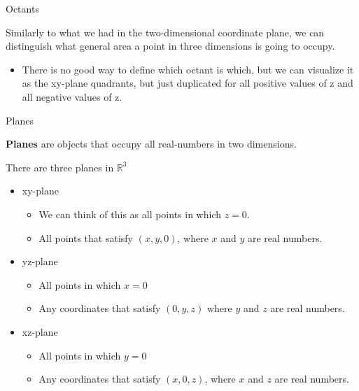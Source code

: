 \documentclass{report}
\newcommand{\R}{\mathbb{R}}
\begin{document}
\begin{sloppypar}
\begin{definition}
  Octants
\end{definition}
Similarly to what we had in the two-dimensional
coordinate plane, we can distinguish what
general area a point in three dimensions is
going to occupy.
\begin{itemize}
  \item There is no good way to define
        which octant is which, but we can
        visualize it as the xy-plane quadrants,
        but just duplicated for all positive
        values of z and all negative values of
        z.
\end{itemize}
\begin{definition}
  Planes
\end{definition}
\textbf{Planes} are objects that occupy
all real-numbers in two dimensions.
\par There are three planes in $ \R^{3} $
\begin{itemize}
  \item xy-plane
        \begin{itemize}
          \item We can think of this as
                all points in which $ z = 0 $.
          \item All  points
                that satisfy $ (x, y, 0) $,
                where $ x $ and $ y $ are
                real numbers.
        \end{itemize}

  \item yz-plane
        \begin{itemize}
          \item All points in which $ x = 0 $
          \item Any coordinates that satisfy
                $ (0, y , z )$ where
                $ y $ and $ z $ are
                real numbers.

        \end{itemize}
  \item xz-plane
        \begin{itemize}
          \item All points in which $ y = 0 $
          \item Any coordinates that
                satisfy $ (x, 0, z)$, where
                $ x $ and $ z $ are real
                numbers.

        \end{itemize}

\end{itemize}


\end{sloppypar}
\end{document}
